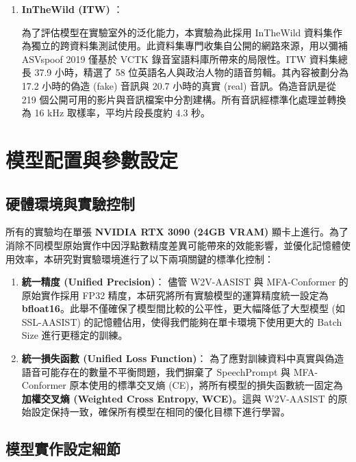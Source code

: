 \begin{enumerate}
\item \textbf{InTheWild (ITW)} \cite{muller2022does}：

為了評估模型在實驗室外的泛化能力，本實驗為此採用 InTheWild 資料集作為獨立的跨資料集測試使用。此資料集專門收集自公開的網路來源，用以彌補 ASVspoof 2019 僅基於 VCTK 錄音室語料庫所帶來的局限性。ITW 資料集總長 37.9 小時，精選了 58 位英語名人與政治人物的語音剪輯。其內容被劃分為 17.2 小時的偽造 (fake) 音訊與 20.7 小時的真實 (real) 音訊。偽造音訊是從 219 個公開可用的影片與音訊檔案中分割建構。所有音訊經標準化處理並轉換為 16 kHz 取樣率，平均片段長度約 4.3 秒。

\end{enumerate}

\section{模型配置與參數設定}
\label{sec:model_description}

\subsection{硬體環境與實驗控制} 
所有的實驗均在單張 \textbf{NVIDIA RTX 3090 (24GB VRAM)} 顯卡上進行。為了消除不同模型原始實作中因浮點數精度差異可能帶來的效能影響，並優化記憶體使用效率，本研究對實驗環境進行了以下兩項關鍵的標準化控制：

\begin{enumerate} \item \textbf{統一精度 (Unified Precision)}： 儘管 W2V-AASIST 與 MFA-Conformer 的原始實作採用 FP32 精度，本研究將所有實驗模型的運算精度統一設定為 \textbf{bfloat16}。此舉不僅確保了模型間比較的公平性，更大幅降低了大型模型 (如 SSL-AASIST) 的記憶體佔用，使得我們能夠在單卡環境下使用更大的 Batch Size 進行更穩定的訓練。

\item \textbf{統一損失函數 (Unified Loss Function)}：
為了應對訓練資料中真實與偽造語音可能存在的數量不平衡問題，我們摒棄了 SpeechPrompt 與 MFA-Conformer 原本使用的標準交叉熵 (CE)，將所有模型的損失函數統一固定為 \textbf{加權交叉熵 (Weighted Cross Entropy, WCE)}。這與 W2V-AASIST 的原始設定保持一致，確保所有模型在相同的優化目標下進行學習。

\end{enumerate}

\subsection{模型實作設定細節}

